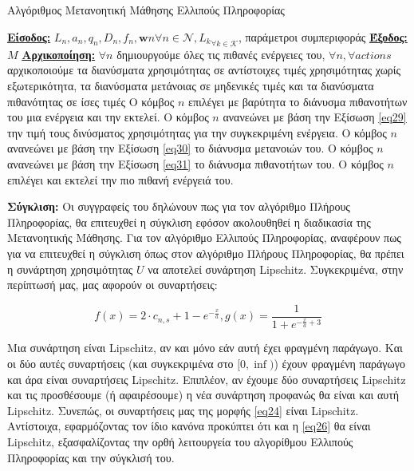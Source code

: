 \begin{algorithm}[h]
\caption{Αλγόριθμος Μετανοητική Μάθησης Ελλιπούς Πληροφορίας} \label{algorithm 6}
\begin{algorithmic}[1]
\STATE \textbf{\underline{Είσοδος:}} ${L_n, a_n, q_n, D_n, f_n, \mathbf{w}n}{\forall n\in \mathcal{N}}, {L_k}_{\forall k \in \mathcal{K}}$, παράμετροι συμπεριφοράς
\STATE \textbf{\underline{Έξοδος:}}  $M$
\STATE \textbf{\underline{Αρχικοποίηση:}} $\forall n$ δημιουργούμε όλες τις πιθανές ενέργειες του, $\forall n, \forall actions$ αρχικοποιούμε τα διανύσματα χρησιμότητας σε αντίστοιχες τιμές χρησιμότητας χωρίς εξωτερικότητα, τα διανύσματα μετάνοιας σε μηδενικές τιμές και τα διανύσματα πιθανότητας σε ίσες τιμές
\STATE Ο κόμβος $n$ επιλέγει με βαρύτητα το διάνυσμα πιθανοτήτων του μια ενέργεια και την εκτελεί.
\ENDFOR
{}
\STATE Ο κόμβος $n$ ανανεώνει με βάση την Εξίσωση \ref{eq29} την τιμή τους δινύσματος χρησιμότητας για την συγκεκριμένη ενέργεια.
\STATE Ο κόμβος $n$ ανανεώνει με βάση την Εξίσωση \ref{eq30} το διάνυσμα μετανοιών του.
\STATE Ο κόμβος $n$ ανανεώνει με βάση την Εξίσωση \ref{eq31} το διάνυσμα πιθανοτήτων του.
\ENDFOR
\ENDWHILE
{}
\STATE Ο κόμβος $n$ επιλέγει και εκτελεί την πιο πιθανή ενέργειά του.
\ENDFOR
\end{algorithmic}
\end{algorithm}
\vspace{-7pt}

\textbf{Σύγκλιση:} Οι συγγραφείς του  δηλώνουν πως για τον αλγόριθμο Πλήρους Πληροφορίας, θα επιτευχθεί η σύγκλιση εφόσον ακολουθηθεί η διαδικασία της Μετανοητικής Μάθησης. Για τον αλγόριθμο Ελλιπούς Πληροφορίας, αναφέρουν πως για να επιτευχθεί η σύγκλιση όπως στον αλγόριθμο Πλήρους Πληροφορίας, θα πρέπει η συνάρτηση χρησιμότητας $U$ να αποτελεί συνάρτηση Lipschitz. Συγκεκριμένα, στην περίπτωσή μας, μας αφορούν οι συναρτήσεις:

\[f(x) = 2 \cdot c_{n,s} + 1 - e^{-\frac{x}{a}}, g(x) = \frac{1}{1 + e^{-\frac{x}{a} + 3}}\]

Μια συνάρτηση είναι Lipschitz, αν και μόνο εάν αυτή έχει φραγμένη παράγωγο. Και οι δύο αυτές συναρτήσεις (και συγκεκριμένα στο $[0,\inf)$) έχουν φραγμένη παράγωγο και άρα είναι συναρτήσεις Lipschitz. Επιπλέον, αν έχουμε δύο συναρτήσεις Lipschitz και τις προσθέσουμε (ή αφαιρέσουμε) η νέα συνάρτηση προφανώς θα είναι και αυτή Lipschitz. Συνεπώς, οι συναρτήσεις μας της μορφής \ref{eq24} είναι Lipschitz. Αντίστοιχα, εφαρμόζοντας τον ίδιο κανόνα προκύπτει ότι και η \ref{eq26} θα είναι Lipschitz, εξασφαλίζοντας την ορθή λειτουργεία του αλγορίθμου Ελλιπούς Πληροφορίας και την σύγκλισή του.

